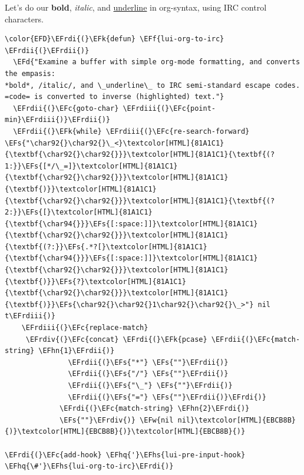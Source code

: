 \documentclass{scrartcl}
\newcommand{\EFk}[1]{\textcolor{EFk}{#1}} %
\newcommand{\EFd}[1]{\textcolor{EFd}{#1}} %
\newcommand{\EFs}[1]{\textcolor{EFs}{#1}} %
\newcommand{\EFw}[1]{\textcolor{EFw}{#1}} %
\newcommand{\EFc}[1]{\textcolor{EFc}{#1}} %
\newcommand{\EFf}[1]{\textcolor{EFf}{#1}} %
\newcommand{\EFhn}[1]{#1} %
\newcommand{\EFhq}[1]{#1} %
\newcommand{\EFhs}[1]{#1} %
\newcommand{\EFrdi}[1]{#1} %
\newcommand{\EFrdii}[1]{#1} %
\newcommand{\EFrdiii}[1]{#1} %
\newcommand{\EFrdiv}[1]{#1} %
\begin{document}
Let's do our \textbf{bold}, \emph{italic}, and \uline{underline} in org-syntax, using IRC control characters.
\begin{Code}
\begin{Verbatim}[]
\color{EFD}\EFrdi{(}\EFk{defun} \EFf{lui-org-to-irc} \EFrdii{(}\EFrdii{)}
  \EFd{"Examine a buffer with simple org-mode formatting, and converts the empasis:
*bold*, /italic/, and \_underline\_ to IRC semi-standard escape codes.
=code= is converted to inverse (highlighted) text."}
  \EFrdii{(}\EFc{goto-char} \EFrdiii{(}\EFc{point-min}\EFrdiii{)}\EFrdii{)}
  \EFrdii{(}\EFk{while} \EFrdiii{(}\EFc{re-search-forward} \EFs{"\char92{}\char92{}\_<}\textcolor[HTML]{81A1C1}{\textbf{\char92{}\char92{}}}\textcolor[HTML]{81A1C1}{\textbf{(?1:}}\EFs{[*/\_=]}\textcolor[HTML]{81A1C1}{\textbf{\char92{}\char92{}}}\textcolor[HTML]{81A1C1}{\textbf{)}}\textcolor[HTML]{81A1C1}{\textbf{\char92{}\char92{}}}\textcolor[HTML]{81A1C1}{\textbf{(?2:}}\EFs{[}\textcolor[HTML]{81A1C1}{\textbf{\char94{}}}\EFs{[:space:]]}\textcolor[HTML]{81A1C1}{\textbf{\char92{}\char92{}}}\textcolor[HTML]{81A1C1}{\textbf{(?:}}\EFs{.*?[}\textcolor[HTML]{81A1C1}{\textbf{\char94{}}}\EFs{[:space:]]}\textcolor[HTML]{81A1C1}{\textbf{\char92{}\char92{}}}\textcolor[HTML]{81A1C1}{\textbf{)}}\EFs{?}\textcolor[HTML]{81A1C1}{\textbf{\char92{}\char92{}}}\textcolor[HTML]{81A1C1}{\textbf{)}}\EFs{\char92{}\char92{}1\char92{}\char92{}\_>"} nil t\EFrdiii{)}
    \EFrdiii{(}\EFc{replace-match}
     \EFrdiv{(}\EFc{concat} \EFrdi{(}\EFk{pcase} \EFrdii{(}\EFc{match-string} \EFhn{1}\EFrdii{)}
               \EFrdii{(}\EFs{"*"} \EFs{""}\EFrdii{)}
               \EFrdii{(}\EFs{"/"} \EFs{""}\EFrdii{)}
               \EFrdii{(}\EFs{"\_"} \EFs{""}\EFrdii{)}
               \EFrdii{(}\EFs{"="} \EFs{""}\EFrdii{)}\EFrdi{)}
             \EFrdi{(}\EFc{match-string} \EFhn{2}\EFrdi{)}
             \EFs{""}\EFrdiv{)} \EFw{nil nil}\textcolor[HTML]{EBCB8B}{)}\textcolor[HTML]{EBCB8B}{)}\textcolor[HTML]{EBCB8B}{)}

\EFrdi{(}\EFc{add-hook} \EFhq{'}\EFhs{lui-pre-input-hook} \EFhq{\#'}\EFhs{lui-org-to-irc}\EFrdi{)}
\end{Verbatim}
\end{Code}
\end{document}
